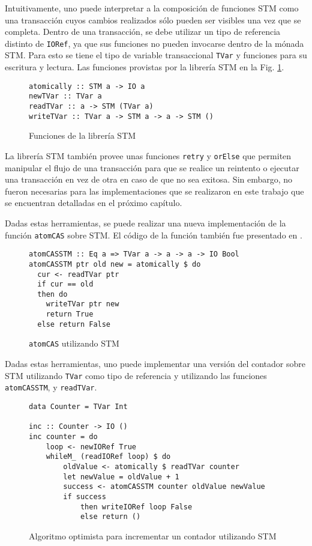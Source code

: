 Intuitivamente, uno puede interpretar a la composición de funciones STM como una transacción cuyos cambios realizados sólo pueden ser visibles una vez que se completa.
Dentro de una transacción, se debe utilizar un tipo de referencia distinto de \texttt{IORef}, ya que sus funciones no pueden invocarse dentro de la mónada STM. Para esto se tiene el tipo de variable transaccional \texttt{TVar} y funciones para su escritura y lectura.
Las funciones provistas por la librería STM en la Fig. \ref{fig:stm-interface}.

\begin{figure}[!h]
\begin{verbatim}
atomically :: STM a -> IO a
newTVar :: TVar a
readTVar :: a -> STM (TVar a)
writeTVar :: TVar a -> STM a -> a -> STM ()
\end{verbatim}
\caption{Funciones de la librería STM}
\label{fig:stm-interface}
\end{figure}

La librería STM también provee unas funciones \texttt{retry} y \texttt{orElse} que permiten manipular el flujo de una transacción para que se realice un reintento o ejecutar una transacción en vez de otra en caso de que no sea exitosa.
Sin embargo, no fueron necesarias para las implementaciones que se realizaron en este trabajo que se encuentran detalladas en el próximo capítulo.

Dadas estas herramientas, se puede realizar una nueva implementación de la función \texttt{atomCAS} sobre STM.
El código de la función también fue presentado en \cite{linked-list}.

\begin{figure}[!h]
\begin{verbatim}
atomCASSTM :: Eq a => TVar a -> a -> a -> IO Bool
atomCASSTM ptr old new = atomically $ do
  cur <- readTVar ptr
  if cur == old
  then do
    writeTVar ptr new
    return True
  else return False
\end{verbatim}
\caption{\texttt{atomCAS} utilizando STM}
\end{figure}

Dadas estas herramientas, uno puede implementar una versión del contador sobre STM utilizando \texttt{TVar} como tipo de referencia y utilizando las funciones \texttt{atomCASSTM}, y \texttt{readTVar}.

\begin{figure}[!h]
\begin{verbatim}
data Counter = TVar Int

inc :: Counter -> IO ()
inc counter = do
    loop <- newIORef True
    whileM_ (readIORef loop) $ do
        oldValue <- atomically $ readTVar counter
        let newValue = oldValue + 1
        success <- atomCASSTM counter oldValue newValue
        if success
            then writeIORef loop False
            else return ()
\end{verbatim}
\caption{Algoritmo optimista para incrementar un contador utilizando STM}
\label{fig:lockfree-counter-example-stm}
\end{figure}

